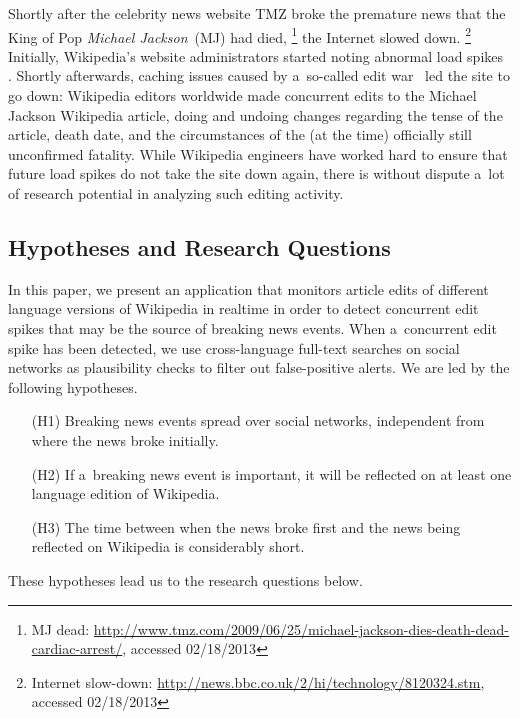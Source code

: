 \documentclass{www13-companion-accepted}
\newcommand{\inlinelistingsize}{\fontsize{8pt}{11pt}}
\let\oldurl\url
\renewcommand{\url}[1]{\inlinelistingsize\oldurl{#1}}
\begin{document}
Shortly after the celebrity news website TMZ
broke the premature news that the King of Pop \emph{Michael Jackson}~(MJ) had died,%
\footnote{MJ dead: \url{http://www.tmz.com/2009/06/25/michael-jackson-dies-death-dead-cardiac-arrest/},
accessed 02/18/2013}
the Internet slowed down.%
\footnote{Internet slow-down: \url{http://news.bbc.co.uk/2/hi/technology/8120324.stm},
accessed 02/18/2013}
Initially, Wikipedia's website administrators started noting abnormal load spikes~%
\cite{vibber2009currentevents}. Shortly afterwards, caching issues
caused by a~so-called edit war~\cite{beaumont2009editwar} led the site to go down:
Wikipedia editors worldwide made concurrent edits
to the Michael Jackson Wikipedia article, doing and undoing changes
regarding the tense of the article, death date,
and the circumstances of the (at the time) officially still unconfirmed fatality.
While Wikipedia engineers have worked hard
to ensure that future load spikes
do not take the site down again, there is without dispute a~lot of research potential
in analyzing such editing activity.

\subsection{Hypotheses and Research Questions}
\label{sec:hypotheses-and-research-questions}

In this paper, we present an application that monitors article edits
of different language versions of Wikipedia in realtime
in order to detect concurrent edit spikes that may be the source of
breaking news events.
When a~concurrent edit spike has been detected,
we use cross-language full-text searches on social networks
as plausibility checks to filter out false-positive alerts.
We are led by the following hypotheses.

\begin{itemize}
  \itemsep0em
  \item[(H1)] Breaking news events spread over social networks,
    independent from where the news broke initially.
  \item[(H2)] If a~breaking news event is important, it will be reflected on
    at least one language edition of Wikipedia.
  \item[(H3)] The time between when the news broke first and the news
    being reflected on Wikipedia is considerably short.   
\end{itemize}

\noindent These hypotheses lead us to the research questions below.
\end{document}
